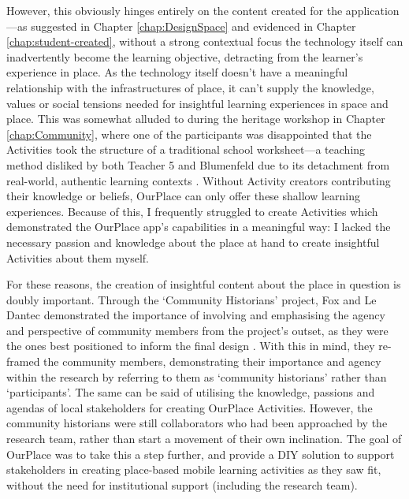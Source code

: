 However, this obviously hinges entirely on the content created for the application---as suggested in Chapter \ref{chap:DesignSpace} and evidenced in Chapter \ref{chap:student-created}, without a strong contextual focus the technology itself can inadvertently become the learning objective, detracting from the learner's experience in place. As the technology itself doesn't have a meaningful relationship with the infrastructures of place, it can't supply the knowledge, values or social tensions needed for insightful learning experiences in space and place. This was somewhat alluded to during the heritage workshop in Chapter \ref{chap:Community}, where one of the participants was disappointed that the Activities took the structure of a traditional school worksheet---a teaching method disliked by both Teacher 5 and Blumenfeld due to its detachment from real-world, authentic learning contexts \citep{Blumenfeld1991}. Without Activity creators contributing their knowledge or beliefs, OurPlace can only offer these shallow learning experiences. Because of this, I frequently struggled to create Activities which demonstrated the OurPlace app's capabilities in a meaningful way: I lacked the necessary passion and knowledge about the place at hand to create insightful Activities about them myself.

For these reasons, the creation of insightful content about the place in question is doubly important. Through the `Community Historians' project, Fox and Le Dantec demonstrated the importance of involving and emphasising the agency and perspective of community members from the project's outset, as they were the ones best positioned to inform the final design \citep{Fox2014}. With this in mind, they re-framed the community members, demonstrating their importance and agency within the research by referring to them as `community historians' rather than `participants'. The same can be said of utilising the knowledge, passions and agendas of local stakeholders for creating OurPlace Activities. However, the community historians were still collaborators who had been approached by the research team, rather than start a movement of their own inclination. The goal of OurPlace was to take this a step further, and provide a DIY solution to support stakeholders in creating place-based mobile learning activities as they saw fit, without the need for institutional support (including the research team).

